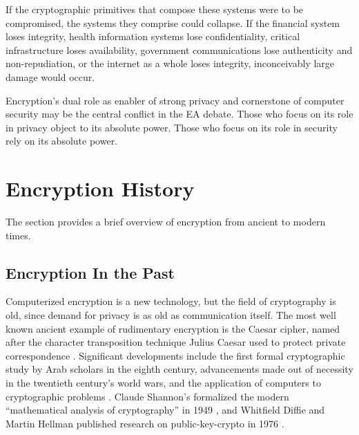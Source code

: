 

If the cryptographic primitives that compose these systems were to be compromised, the systems they comprise could
collapse. If the financial system loses integrity, health information systems lose confidentiality, critical
infrastructure loses availability, government communications lose authenticity and non-repudiation, or the internet as a
whole loses integrity, inconceivably large damage would occur.

Encryption's dual role as enabler of strong privacy and cornerstone of computer security may be the central conflict in
the EA debate. Those who focus on its role in privacy object to its absolute power. Those who focus on its role in
security rely on its absolute power.



\section{Encryption History}
\label{sec-crypto-history}

The section provides a brief overview of encryption from ancient to modern times.

\subsection{Encryption In the Past}
\label{sec-history-old}

Computerized encryption is a new technology, but the field of cryptography is old, since demand for privacy is as old as
communication itself. The most well known ancient example of rudimentary encryption is the Caesar cipher, named after
the character transposition technique Julius Caesar used to protect private correspondence
\cite{luciano_cryptology_1987}. Significant developments include the first formal cryptographic study by Arab scholars
in the eighth century, advancements made out of necessity in the twentieth century's world wars, and the application of
computers to cryptographic problems \cite{kahn_codebreakers_1996}. Claude Shannon's formalized the modern ``mathematical
analysis of cryptography'' in 1949 \cite{shannon_communication_1949}, and Whitfield Diffie and Martin Hellman published
research on \ac{public-key-crypto} in 1976 \cite{diffie_new_1976}.

